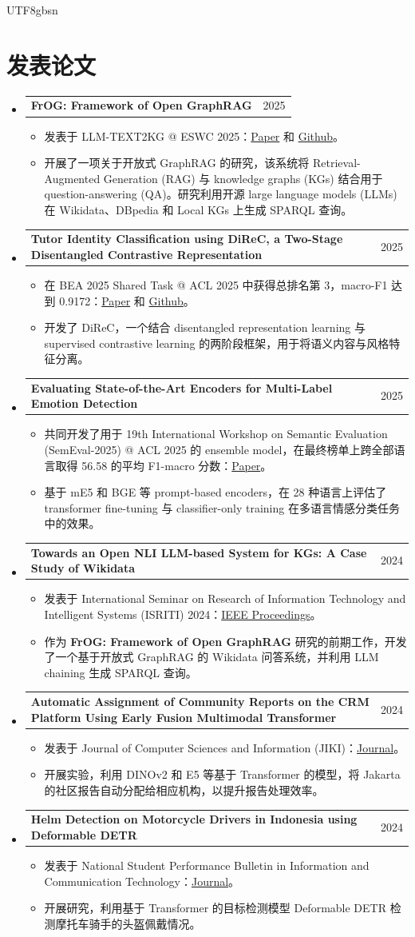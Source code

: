 \documentclass[letterpaper,10pt]{article}
\makeatletter
\newcommand{\resumeItem}[1]{
  \item\small{
    {#1 \vspace{0pt}}
  }
}
\newcommand{\resumeProjectHeading}[2]{
    \item
    \begin{tabular*}{0.97\textwidth}{p{0.82\textwidth}@{\extracolsep{\fill}}r}
      \small#1 & #2 \\
    \end{tabular*}\vspace{0pt}
}
\newcommand{\resumeSubHeadingListStart}{\begin{itemize}[leftmargin=0.1in, label={}, itemsep=0pt, parsep=0pt]}
\newcommand{\resumeSubHeadingListEnd}{\end{itemize}}
\newcommand{\resumeItemListStart}{\begin{itemize}[itemsep=0pt, parsep=0pt, topsep=0pt]}
\newcommand{\resumeItemListEnd}{\end{itemize}\vspace{0pt}}
\makeatother
\begin{document}
\begin{CJK*}{UTF8}{gbsn}
	\section{发表论文}
	\resumeSubHeadingListStart
	\resumeProjectHeading
	{\textbf{FrOG: Framework of Open GraphRAG}}{2025}
	\resumeItemListStart
	\resumeItem{发表于 LLM-TEXT2KG @ ESWC 2025：\href{https://ceur-ws.org/Vol-4020/Paper_ID_7.pdf}{Paper} 和 \href{https://github.com/Framework-of-Open-GraphRAG/FROG}{Github}。}
	\resumeItem{开展了一项关于开放式 GraphRAG 的研究，该系统将 Retrieval-Augmented Generation (RAG) 与 knowledge graphs (KGs) 结合用于 question-answering (QA)。研究利用开源 large language models (LLMs) 在 Wikidata、DBpedia 和 Local KGs 上生成 SPARQL 查询。}
	\resumeItemListEnd
	\resumeProjectHeading
	{\textbf{Tutor Identity Classification using DiReC, a Two-Stage Disentangled Contrastive Representation}}{2025}
	\resumeItemListStart
	\resumeItem{在 BEA 2025 Shared Task @ ACL 2025 中获得总排名第 3，macro-F1 达到 0.9172：\href{https://aclanthology.org/2025.bea-1.97/}{Paper} 和 \href{https://github.com/edutjie/DiReC}{Github}。}
	\resumeItem{开发了 DiReC，一个结合 disentangled representation learning 与 supervised contrastive learning 的两阶段框架，用于将语义内容与风格特征分离。}
	\resumeItemListEnd
	\resumeProjectHeading
	{\textbf{Evaluating State-of-the-Art Encoders for Multi-Label Emotion Detection}}{2025}
	\resumeItemListStart
	\resumeItem{共同开发了用于 19th International Workshop on Semantic Evaluation (SemEval-2025) @ ACL 2025 的 ensemble model，在最终榜单上跨全部语言取得 56.58 的平均 F1-macro 分数：\href{https://aclanthology.org/2025.bea-1.97/}{Paper}。}
	\resumeItem{基于 mE5 和 BGE 等 prompt-based encoders，在 28 种语言上评估了 transformer fine-tuning 与 classifier-only training 在多语言情感分类任务中的效果。}
	\resumeItemListEnd
	\resumeProjectHeading
	{\textbf{Towards an Open NLI LLM-based System for KGs: A Case Study of Wikidata}}{2024}
	\resumeItemListStart
	\resumeItem{发表于 International Seminar on Research of Information Technology and Intelligent Systems (ISRITI) 2024：\href{https://ieeexplore.ieee.org/document/10963661}{IEEE Proceedings}。}
	\resumeItem{作为 \textbf{FrOG: Framework of Open GraphRAG} 研究的前期工作，开发了一个基于开放式 GraphRAG 的 Wikidata 问答系统，并利用 LLM chaining 生成 SPARQL 查询。}
	\resumeItemListEnd
	\resumeProjectHeading
	{\textbf{Automatic Assignment of Community Reports on the CRM Platform Using Early Fusion Multimodal Transformer}}{2024}
	\resumeItemListStart
	\resumeItem{发表于 Journal of Computer Sciences and Information (JIKI)：\href{https://jiki.cs.ui.ac.id/index.php/jiki/article/view/1426}{Journal}。}
	\resumeItem{开展实验，利用 DINOv2 和 E5 等基于 Transformer 的模型，将 Jakarta 的社区报告自动分配给相应机构，以提升报告处理效率。}
	\resumeItemListEnd
	\resumeProjectHeading
	{\textbf{Helm Detection on Motorcycle Drivers in Indonesia using Deformable DETR}}{2024}
	\resumeItemListStart
	\resumeItem{发表于 National Student Performance Bulletin in Information and Communication Technology：\href{https://buletingemastik.id/index.php/bg/article/view/202404.009}{Journal}。}
	\resumeItem{开展研究，利用基于 Transformer 的目标检测模型 Deformable DETR 检测摩托车骑手的头盔佩戴情况。}
	\resumeItemListEnd
	\resumeSubHeadingListEnd


\end{CJK*}
\end{document}

